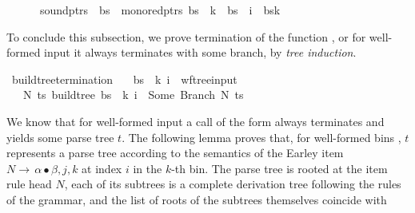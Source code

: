 \begin{isabellebody}
\ \ \ \ \ \ sound{\isacharunderscore}{\kern0pt}ptrs\ {\isasymomega}\ bs\ {\isasymand}\ mono{\isacharunderscore}{\kern0pt}red{\isacharunderscore}{\kern0pt}ptrs\ bs\ {\isasymand}\ k\ {\isacharless}{\kern0pt}\ {\isacharbar}{\kern0pt}bs{\isacharbar}{\kern0pt}\ {\isasymand}\ i\ {\isacharless}{\kern0pt}\ {\isacharbar}{\kern0pt}bs{\isacharbang}{\kern0pt}k{\isacharbar}{\kern0pt}\ {\isacharbraceright}{\kern0pt}{\isachardoublequoteclose}%
\begin{isamarkuptext}%
To conclude this subsection, we prove termination of the function , or for
well-formed input it always terminates with some branch, by \textit{tree induction}.%
\end{isamarkuptext}\isamarkuptrue%
\isamarkupfalse%
\ build{\isacharunderscore}{\kern0pt}tree{\isacharprime}{\kern0pt}{\isacharunderscore}{\kern0pt}termination{\isacharcolon}{\kern0pt}\isanewline
\ \ \ {\isachardoublequoteopen}{\isacharparenleft}{\kern0pt}bs{\isacharcomma}{\kern0pt}\ {\isasymomega}{\isacharcomma}{\kern0pt}\ k{\isacharcomma}{\kern0pt}\ i{\isacharparenright}{\kern0pt}\ {\isasymin}\ wf{\isacharunderscore}{\kern0pt}tree{\isacharunderscore}{\kern0pt}input{\isachardoublequoteclose}\isanewline
\ \ \ {\isachardoublequoteopen}{\isasymexists}N\ ts{\isachardot}{\kern0pt}\ build{\isacharunderscore}{\kern0pt}tree{\isacharprime}{\kern0pt}\ bs\ {\isasymomega}\ k\ i\ {\isacharequal}{\kern0pt}\ Some\ {\isacharparenleft}{\kern0pt}Branch\ N\ ts{\isacharparenright}{\kern0pt}{\isachardoublequoteclose}%
\isadelimproof
%
\endisadelimproof
%
\isatagproof
%
\endisatagproof
{\isafoldproof}%
%
\isadelimproof
%
\endisadelimproof
%
\isadelimdocument
%
\endisadelimdocument
%
\isatagdocument
%
\isamarkuptrue%
%
\endisatagdocument
{\isafolddocument}%
%
\isadelimdocument
%
\endisadelimdocument
%
\begin{isamarkuptext}%
We know that for well-formed input a call of the form  always terminates
and yields some parse tree $t$. The following lemma proves that, for well-formed bins ,
$t$ represents a parse tree according to the semantics of the Earley item $N \rightarrow \, \alpha \bullet \beta, j, k$
at index $i$ in the $k$-th bin. The parse tree is rooted at the item rule head $N$, each of its subtrees is a complete derivation
tree following the rules of the grammar, and the list of roots of the subtrees themselves coincide with

\end{isamarkuptext}
\end{isabellebody}
